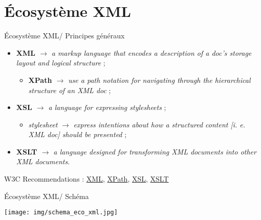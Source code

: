 \documentclass{beamer}
\begin{document}
  \section{Écosystème XML}
  \begin{frame}{Écosystème XML/ Principes généraux}
  \Large
  \begin{itemize}
      \item \textbf{XML $\rightarrow$} \textit{a markup language that encodes a description of a doc's storage layout and logical structure} ; %
      \begin{itemize}
          \item \textbf{XPath $\rightarrow$} \textit{use a path notation for navigating through the hierarchical structure of an XML doc} ;
      \end{itemize}
      \bigskip
      \item \textbf{XSL $\rightarrow$} \textit{a language for expressing stylesheets} ;
      \begin{itemize}
          \item \textit{stylesheet} $\rightarrow$ \textit{express intentions about how a structured content [i. e. XML doc] should be presented} ;
      \end{itemize}
      \bigskip
      \item \textbf{XSLT $\rightarrow$} \textit{a language designed for transforming XML documents into other XML documents}.
  \end{itemize}
   
   \footnotesize W3C Recommendations : \href{https://www.w3.org/TR/xml11/}{XML}, \href{https://www.w3.org/TR/xpath-31/}{XPath}, \href{https://www.w3.org/TR/xsl/}{XSL}, \href{https://www.w3.org/TR/xslt-30/}{XSLT}
   
  \end{frame}
  
  \begin{frame}{Écosystème XML/ Schéma}
      \begin{center}
          \texttt{[image: img/schema\_eco\_xml.jpg]}
      \end{center}
  \end{frame}
  
\end{document}
